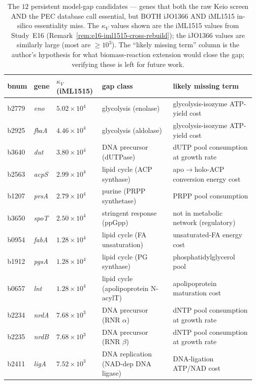 \documentclass[11pt,a4paper]{article}
\theoremstyle{plain}
\theoremstyle{definition}
\theoremstyle{remark}
\begin{document}
\begin{table}[h]
\centering
\small
\begin{tabularx}{\columnwidth}{@{}lll>{\raggedright\arraybackslash}X>{\raggedright\arraybackslash}X@{}}
\hline
bnum & gene & $\kappa_V$ (iML1515) & gap class & likely missing term \\
\hline
b2779 & \emph{eno}  & $5.02 \times 10^4$ & glycolysis (enolase)            & glycolysis-isozyme ATP-yield cost \\
b2925 & \emph{fbaA} & $4.46 \times 10^4$ & glycolysis (aldolase)            & glycolysis-isozyme ATP-yield cost \\
b3640 & \emph{dut}  & $3.80 \times 10^4$ & DNA precursor (dUTPase)          & dUTP pool consumption at growth rate \\
b2563 & \emph{acpS} & $2.99 \times 10^4$ & lipid cycle (ACP synthase)       & apo$\to$holo-ACP conversion energy cost \\
b1207 & \emph{prsA} & $2.79 \times 10^4$ & purine (PRPP synthetase)         & PRPP pool consumption \\
b3650 & \emph{spoT} & $2.50 \times 10^4$ & stringent response (ppGpp)       & not in metabolic network (regulatory) \\
b0954 & \emph{fabA} & $1.28 \times 10^4$ & lipid cycle (FA unsaturation)    & unsaturated-FA energy cost \\
b1912 & \emph{pgsA} & $1.28 \times 10^4$ & lipid cycle (PG synthase)        & phosphatidylglycerol pool \\
b0657 & \emph{lnt}  & $1.28 \times 10^4$ & lipid cycle (apolipoprotein N-acylT) & apolipoprotein maturation cost \\
b2234 & \emph{nrdA} & $7.68 \times 10^3$ & DNA precursor (RNR $\alpha$)     & dNTP pool consumption at growth rate \\
b2235 & \emph{nrdB} & $7.68 \times 10^3$ & DNA precursor (RNR $\beta$)      & dNTP pool consumption at growth rate \\
b2411 & \emph{ligA} & $7.52 \times 10^3$ & DNA replication (NAD-dep DNA ligase) & DNA-ligation ATP/NAD cost \\
\hline
\end{tabularx}
\caption{The $12$ persistent model-gap candidates --- genes that both
the raw Keio screen AND the PEC database call essential, but BOTH
iJO1366 AND iML1515 in-silico essentiality miss. The $\kappa_V$ values
shown are the iML1515 values from Study~E16
(Remark~\ref{rem:e16-iml1515-cross-rebuild}); the iJO1366 values are
similarly large (most are $\geq 10^3$). The ``likely missing term''
column is the author's hypothesis for what biomass-reaction extension
would close the gap; verifying these is left for future work.}
\label{tab:gem-limitations}
\end{table}
\end{document}
